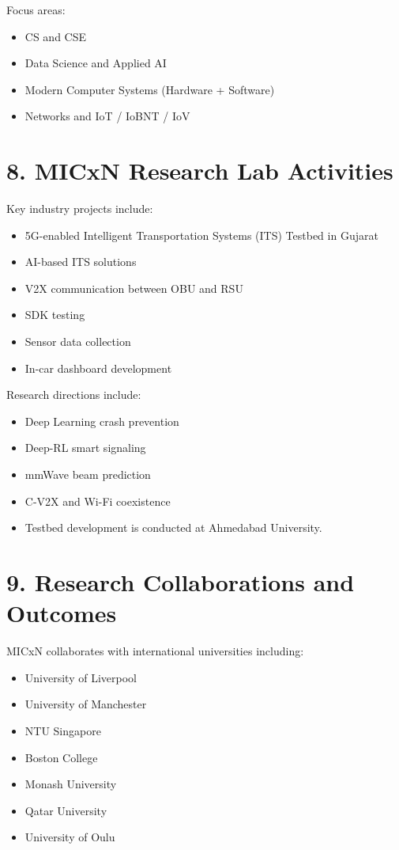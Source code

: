 \documentclass[11pt]{article}
\begin{document}
Focus areas:

\begin{itemize}
\item CS and CSE
\item Data Science and Applied AI
\item Modern Computer Systems (Hardware + Software)
\item Networks and IoT / IoBNT / IoV
\end{itemize}

\section*{8. MICxN Research Lab Activities}

Key industry projects include:

\begin{itemize}
\item 5G-enabled Intelligent Transportation Systems (ITS) Testbed in Gujarat
\item AI-based ITS solutions
\item V2X communication between OBU and RSU
\item SDK testing
\item Sensor data collection
\item In-car dashboard development
\end{itemize}

Research directions include:

\begin{itemize}
\item Deep Learning crash prevention
\item Deep-RL smart signaling
\item mmWave beam prediction
\item C-V2X and Wi-Fi coexistence
\item Testbed development is conducted at Ahmedabad University.
\end{itemize}

\section*{9. Research Collaborations and Outcomes}

MICxN collaborates with international universities including:

\begin{itemize}
\item University of Liverpool
\item University of Manchester
\item NTU Singapore
\item Boston College
\item Monash University
\item Qatar University
\item University of Oulu
\end{itemize}
\end{document}
